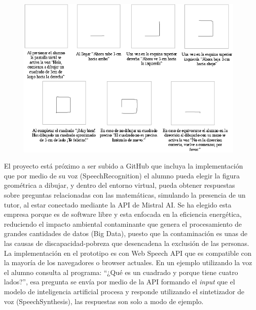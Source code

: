 \documentclass{article}
\begin{document}
\begin{figure}[H]
\vspace{-0.2cm}	
	\includegraphics[width=1\textwidth,height=0.43\textheight]{Guia_al_dibujar_un_cuadrado.png}
	\label{fig:Guia}
\end{figure}

\vspace{-0.49cm}
{\changefontsizes{8.8pt}
El proyecto está próximo a ser subido a GitHub que incluya la implementación que por medio de su voz (SpeechRecognition) el alumno pueda elegir la figura geométrica a dibujar, y dentro del entorno virtual, pueda obtener respuestas sobre preguntas relacionadas con las matemáticas, simulando la presencia de un tutor, al estar conectado mediante la API de Mistral AI. Se ha elegido esta empresa porque es de software libre y esta enfocada en la eficiencia energética, reduciendo el impacto ambiental contaminante que genera el procesamiento de grandes cantidades de datos (Big Data), puesto que la contaminación es unas de las causas de discapacidad-pobreza que desencadena la exclusión de las personas. La implementación en el prototipo es con Web Speech API que es compatible con la mayoría de los navegadores o browser actuales.
En un ejemplo utilizando la voz el alumno consulta al programa: “¿Qué es un cuadrado y porque tiene cuatro lados?”, esa pregunta se envía por medio de la API formando el \textit{input} que el modelo de inteligencia artificial procesa y responde utilizando el sintetizador de voz (SpeechSynthesis), las respuestas son solo a modo de ejemplo.}
\end{document}
